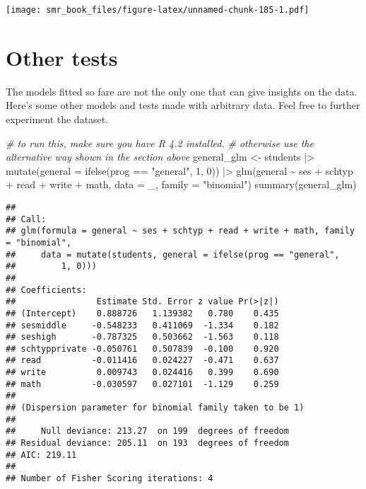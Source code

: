 \documentclass[
  oneside]{book}
\newenvironment{Shaded}{\begin{snugshade}}{\end{snugshade}}
\newcommand{\AttributeTok}[1]{\textcolor[rgb]{0.77,0.63,0.00}{#1}}
\newcommand{\CommentTok}[1]{\textcolor[rgb]{0.56,0.35,0.01}{\textit{#1}}}
\newcommand{\DecValTok}[1]{\textcolor[rgb]{0.00,0.00,0.81}{#1}}
\newcommand{\FunctionTok}[1]{\textcolor[rgb]{0.00,0.00,0.00}{#1}}
\newcommand{\NormalTok}[1]{#1}
\newcommand{\OtherTok}[1]{\textcolor[rgb]{0.56,0.35,0.01}{#1}}
\newcommand{\SpecialCharTok}[1]{\textcolor[rgb]{0.00,0.00,0.00}{#1}}
\newcommand{\StringTok}[1]{\textcolor[rgb]{0.31,0.60,0.02}{#1}}
\begin{document}
\texttt{[image: smr\_book\_files/figure-latex/unnamed-chunk-185-1.pdf]}

\hypertarget{other-tests}{%
\section{Other tests}\label{other-tests}}

The models fitted so fare are not the only one that can give
insights on the data. Here's some other models and tests made with
arbitrary data.
Feel free to further experiment the dataset.

\begin{Shaded}
\begin{Highlighting}[]
\CommentTok{\# to run this, make sure you have R 4.2 installed.}
\CommentTok{\# otherwise use the alternative way shown in the section above}
\NormalTok{general\_glm }\OtherTok{\textless{}{-}}\NormalTok{ students }\SpecialCharTok{|\textgreater{}} 
  \FunctionTok{mutate}\NormalTok{(}\AttributeTok{general =} \FunctionTok{ifelse}\NormalTok{(prog }\SpecialCharTok{==} \StringTok{"general"}\NormalTok{, }\DecValTok{1}\NormalTok{, }\DecValTok{0}\NormalTok{)) }\SpecialCharTok{|\textgreater{}}
  \FunctionTok{glm}\NormalTok{(general }\SpecialCharTok{\textasciitilde{}}\NormalTok{ ses }\SpecialCharTok{+}\NormalTok{ schtyp }\SpecialCharTok{+}\NormalTok{ read }\SpecialCharTok{+}\NormalTok{ write }\SpecialCharTok{+}\NormalTok{ math,}
    \AttributeTok{data =}\NormalTok{ \_, }\AttributeTok{family =} \StringTok{"binomial"}\NormalTok{)}
\FunctionTok{summary}\NormalTok{(general\_glm)}
\end{Highlighting}
\end{Shaded}

\begin{verbatim}
## 
## Call:
## glm(formula = general ~ ses + schtyp + read + write + math, family = "binomial", 
##     data = mutate(students, general = ifelse(prog == "general", 
##         1, 0)))
## 
## Coefficients:
##                Estimate Std. Error z value Pr(>|z|)
## (Intercept)    0.888726   1.139382   0.780    0.435
## sesmiddle     -0.548233   0.411069  -1.334    0.182
## seshigh       -0.787325   0.503662  -1.563    0.118
## schtypprivate -0.050761   0.507839  -0.100    0.920
## read          -0.011416   0.024227  -0.471    0.637
## write          0.009743   0.024416   0.399    0.690
## math          -0.030597   0.027101  -1.129    0.259
## 
## (Dispersion parameter for binomial family taken to be 1)
## 
##     Null deviance: 213.27  on 199  degrees of freedom
## Residual deviance: 205.11  on 193  degrees of freedom
## AIC: 219.11
## 
## Number of Fisher Scoring iterations: 4
\end{verbatim}
\end{document}
